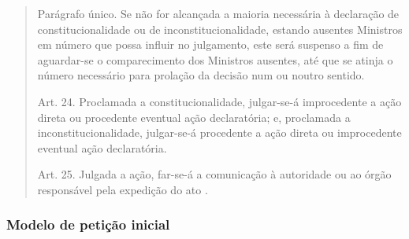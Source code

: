 \documentclass{article}
\begin{document}
\begin{quote}
Parágrafo único. Se não for alcançada a maioria necessária à declaração de constitucionalidade ou de inconstitucionalidade, estando ausentes Ministros em número que possa influir no julgamento, este será suspenso a fim de aguardar-se o comparecimento dos Ministros ausentes, até que se atinja o número necessário para prolação da decisão num ou noutro sentido.

Art. 24. Proclamada a constitucionalidade, julgar-se-á improcedente a ação direta ou procedente eventual ação declaratória; e, proclamada a inconstitucionalidade, julgar-se-á procedente a ação direta ou improcedente eventual ação declaratória.

Art. 25. Julgada a ação, far-se-á a comunicação à autoridade ou ao órgão responsável pela expedição do ato \cite{brasil_lei9868_1999}.
\end{quote}

\subsubsection{Modelo de petição inicial}
\end{document}

